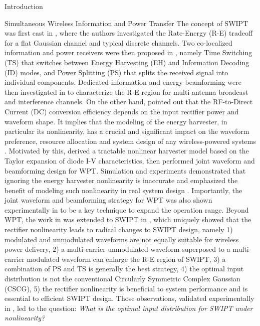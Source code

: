 \documentclass[journal]{IEEEtran}
\begin{document}
\begin{section}{Introduction}
\begin{subsection}{Simultaneous Wireless Information and Power Transfer}
			The concept of SWIPT was first cast in \cite{Varshney2008}, where the authors investigated the Rate-Energy (R-E) tradeoff for a flat Gaussian channel and typical discrete channels. Two co-localized information and power receivers were then proposed in \cite{Zhou2013}, namely Time Switching (TS) that switches between Energy Harvesting (EH) and Information Decoding (ID) modes, and Power Splitting (PS) that splits the received signal into individual components. Dedicated information and energy beamforming were then investigated in \cite{Zhang2013,Park2013} to characterize the R-E region for multi-antenna broadcast and interference channels. On the other hand, \cite{Trotter2009} pointed out that the RF-to-Direct Current (DC) conversion efficiency depends on the input rectifier power and waveform shape. It implies that the modeling of the energy harvester, in particular its nonlinearity, has a crucial and significant impact on the waveform preference, resource allocation and system design of any wireless-powered systems \cite{Trotter2009,Clerckx2018,Clerckx2019}. Motivated by this, \cite{Clerckx2016a} derived a tractable nonlinear harvester model based on the Taylor expansion of diode I-V characteristics, then performed joint waveform and beamforming design for WPT. Simulation and experiments demonstrated that ignoring the energy harvester nonlinearity is inaccurate and emphasized the benefit of modeling such nonlinearity in real system design \cite{Kim2019,Kim2020a}. Importantly, the joint waveform and beamforming strategy for WPT was also shown experimentally in \cite{Kim2020} to be a key technique to expand the operation range. Beyond WPT, the work in \cite{Clerckx2016a} was extended to SWIPT in \cite{Clerckx2018b}, which uniquely showed that the rectifier nonlinearity leads to radical changes to SWIPT design, namely 1) modulated and unmodulated waveforms are not equally suitable for wireless power delivery, 2) a multi-carrier unmodulated waveform superposed to a multi-carrier modulated waveform can enlarge the R-E region of SWIPT, 3) a combination of PS and TS is generally the best strategy, 4) the optimal input distribution is not the conventional Circularly Symmetric Complex Gaussian (CSCG), 5) the rectifier nonlinearity is beneficial to system performance and is essential to efficient SWIPT design. Those observations, validated experimentally in \cite{Kim2019}, led to the question: \textit{What is the optimal input distribution for SWIPT under nonlinearity?}

\end{subsection}
\end{section}
\end{document}
